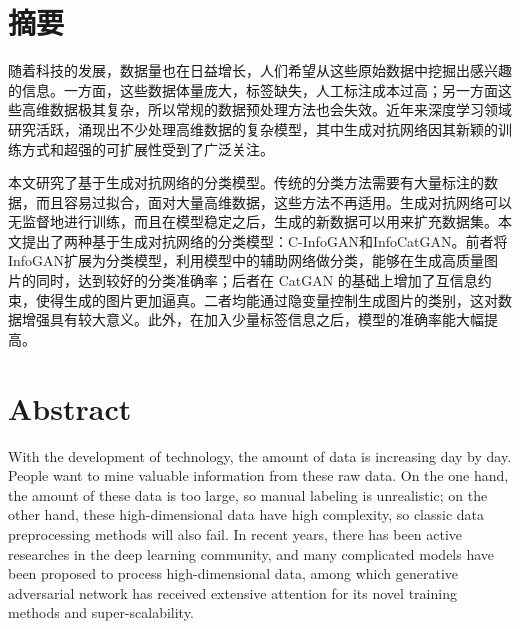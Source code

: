 \maketitle%
\MAKETITLE%
\makedeclaration%
\intobmk\chapter*{摘\quad 要}%
\setcounter{page}{1}%

随着科技的发展，数据量也在日益增长，人们希望从这些原始数据中挖掘出感兴趣的信息。一方面，这些数据体量庞大，标签缺失，人工标注成本过高；另一方面这些高维数据极其复杂，所以常规的数据预处理方法也会失效。近年来深度学习领域研究活跃，涌现出不少处理高维数据的复杂模型，其中生成对抗网络因其新颖的训练方式和超强的可扩展性受到了广泛关注。

本文研究了基于生成对抗网络的分类模型。传统的分类方法需要有大量标注的数据，而且容易过拟合，面对大量高维数据，这些方法不再适用。生成对抗网络可以无监督地进行训练，而且在模型稳定之后，生成的新数据可以用来扩充数据集。本文提出了两种基于生成对抗网络的分类模型：C-InfoGAN和InfoCatGAN。前者将InfoGAN扩展为分类模型，利用模型中的辅助网络做分类，能够在生成高质量图片的同时，达到较好的分类准确率；后者在 CatGAN 的基础上增加了互信息约束，使得生成的图片更加逼真。二者均能通过隐变量控制生成图片的类别，这对数据增强具有较大意义。此外，在加入少量标签信息之后，模型的准确率能大幅提高。

\intobmk\chapter*{Abstract}%

With the development of technology, the amount of data is increasing day by day. People want to mine valuable information from these raw data. On the one hand, the amount of these data is too large, so manual labeling is unrealistic; on the other hand, these high-dimensional data have high complexity, so classic data preprocessing methods will also fail. In recent years, there has been active researches in the deep learning community, and many complicated models have been proposed to process high-dimensional data, among which generative adversarial network has received extensive attention for its novel training methods and super-scalability.

